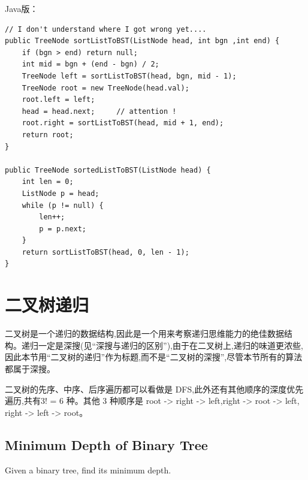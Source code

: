 \documentclass[12pt]{book}
\begin{document}
\begin{enumerate}
Java版：

\lstset{language=java,label= ,caption= ,numbers=none}
\begin{lstlisting}
// I don't understand where I got wrong yet....
public TreeNode sortListToBST(ListNode head, int bgn ,int end) {
    if (bgn > end) return null;
    int mid = bgn + (end - bgn) / 2;
    TreeNode left = sortListToBST(head, bgn, mid - 1);
    TreeNode root = new TreeNode(head.val);
    root.left = left;
    head = head.next;     // attention !
    root.right = sortListToBST(head, mid + 1, end);
    return root;
}
        
public TreeNode sortedListToBST(ListNode head) {
    int len = 0;
    ListNode p = head;
    while (p != null) {
        len++;
        p = p.next;
    }
    return sortListToBST(head, 0, len - 1);
}
\end{lstlisting}
\end{enumerate}

\section{二叉树递归}
\label{sec-4-5}
二叉树是一个递归的数据结构,因此是一个用来考察递归思维能力的绝佳数据结构。递归一定是深搜(见“深搜与递归的区别”),由于在二叉树上,递归的味道更浓些,因此本节用“二叉树的递归”作为标题,而不是“二叉树的深搜”,尽管本节所有的算法都属于深搜。

二叉树的先序、中序、后序遍历都可以看做是 DFS,此外还有其他顺序的深度优先遍历,共有3! = 6 种。其他 3 种顺序是 root -> right -> left,right -> root -> left, right -> left -> root。
\subsection{Minimum Depth of Binary Tree}
\label{sec-4-5-1}
Given a binary tree, find its minimum depth.
\end{document}
